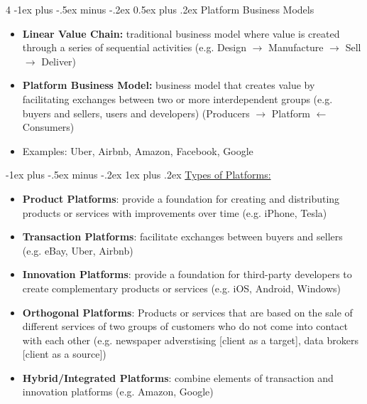 \documentclass[10pt, landscape]{article}
\makeatletter
\renewcommand{\section}{\@startsection{section}{1}{0mm}%
  {-1ex plus -.5ex minus -.2ex}%
  {0.5ex plus .2ex}%
{\normalfont\large\bfseries}}
\renewcommand{\subsubsection}{\@startsection{subsubsection}{3}{0mm}%
  {-1ex plus -.5ex minus -.2ex}%
  {1ex plus .2ex}%
{\normalfont\small\bfseries}}%
\makeatother
\begin{document}
\begin{multicols*}{4}
  \section{Platform Business Models}

  \begin{itemize}
    \item \textbf{Linear Value Chain:} traditional business model where value is created through a series of sequential activities \newline (e.g. Design $\rightarrow$ Manufacture $\rightarrow$ Sell $\rightarrow$ Deliver)
    \item \textbf{Platform Business Model:} business model that creates value by facilitating exchanges between two or more interdependent groups (e.g. buyers and sellers, users and developers) \newline (Producers $\rightarrow$ Platform $\leftarrow$ Consumers)
    \item Examples: Uber, Airbnb, Amazon, Facebook, Google
  \end{itemize}

  \subsubsection{\underline{Types of Platforms:}}
    \begin{itemize}
      \item \textbf{Product Platforms}: provide a foundation for creating and distributing products or services with improvements over time (e.g. iPhone, Tesla)
      \item \textbf{Transaction Platforms}: facilitate exchanges between buyers and sellers (e.g. eBay, Uber, Airbnb)
      \item \textbf{Innovation Platforms}: provide a foundation for third-party developers to create complementary products or services (e.g. iOS, Android, Windows)
      \item \textbf{Orthogonal Platforms}: Products or services that are based on the sale of different services of two groups of customers who do not come into contact with each other (e.g. newspaper adverstising [client as a target], data brokers [client as a source])
      \item \textbf{Hybrid/Integrated Platforms}: combine elements of transaction and innovation platforms (e.g. Amazon, Google)
    \end{itemize}



\end{multicols*}
\end{document}
